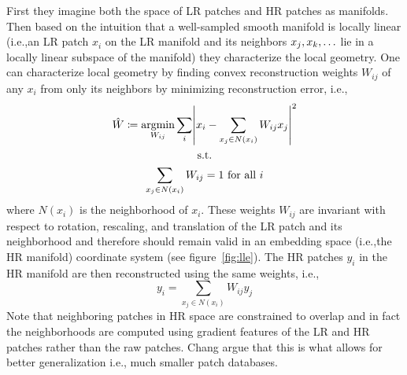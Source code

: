 %
First they imagine both the space of LR patches and HR patches as manifolds.
%
Then based on the intuition that a well-sampled smooth manifold is locally linear (i.e.,an LR patch \(x_i\) on the LR manifold and its neighbors \(x_j, x_k, \mathellipsis\) lie in a locally linear subspace of the manifold) they characterize the local geometry.
%
One can characterize local geometry by finding convex reconstruction weights \(W_{ij}\) of any \(x_i\) from only its neighbors by minimizing reconstruction error, i.e.,\begin{gather}
    \hat{W} \coloneqq \underset{W_{ij}}{\text{argmin}} \sum_i \abs{ x_i - \sum_{x_j \in N(x_i)} W_{ij} x_j  }^2 \nonumber \\
    \text{s.t.} \\
    \sum_{x_j \in N(x_i)} W_{ij} = 1 \text{ for all }i \nonumber
\end{gather}
where \(N(x_i)\) is the neighborhood of \(x_i\).
%
These weights \(W_{ij}\) are invariant with respect to rotation, rescaling, and translation of the LR patch and its neighborhood \cite{saul2000introduction} and therefore should remain valid in an embedding space (i.e.,the HR manifold) coordinate system (see figure~\ref{fig:lle}).
%
The HR patches \(y_i\) in the HR manifold are then reconstructed using the same weights, i.e.,
\begin{equation}
    y_i = \sum_{x_j \in N(x_i)} W_{ij} y_j
\end{equation}
%
Note that neighboring patches in HR space are constrained to overlap and in fact the neighborhoods are computed using gradient features of the LR and HR patches rather than the raw patches.
%
Chang \etal argue that this is what allows for better generalization i.e., much smaller patch databases.

